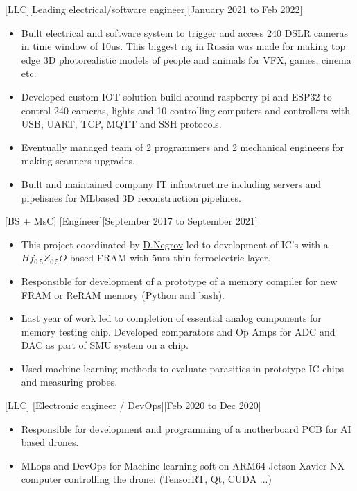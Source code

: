 \documentclass{article}
\begin{document}
[LLC][Leading electrical/software engineer][January 2021 to Feb 2022]
\begin{itemize}
   \item Built electrical and software system to trigger and access 240 DSLR cameras in time window of 10us. This biggest rig in Russia was made for making top edge 3D photorealistic models of people and animals for VFX, games, cinema etc.
   \item Developed custom IOT solution build around raspberry pi and ESP32 to control 240 cameras, lights and 10 controlling computers and controllers with USB, UART, TCP, MQTT and SSH protocols.
   \item Eventually managed team of 2 programmers and 2 mechanical engineers for making scanners upgrades.
   \item Built and maintained company IT infrastructure including servers and pipelisnes for MLbased 3D reconstruction pipelines.
   \end{itemize}

[BS + MsC]
[Engineer][September 2017 to September 2021]

\begin{itemize}
\item This project coordinated by  \href{https://www.scopus.com/authid/detail.uri?authorId=56272708000}{D.Negrov}   led to development of IC's with a $Hf_{0.5} Z_{0.5} O $ based  FRAM with 5nm thin ferroelectric layer.
\item Responsible for development of a prototype of a memory  compiler for new FRAM or ReRAM memory (Python and bash).
\item Last year of work led to completion of essential analog components for memory testing chip. Developed comparators and Op Amps for ADC and DAC as part of SMU system on a chip.
\item Used machine learning methods to evaluate parasitics in prototype IC chips and measuring probes.

\end{itemize}
 

 
[LLC]
[Electronic engineer / DevOps][Feb 2020 to Dec 2020]
 
\begin{itemize}
\item Responsible for development and programming of a motherboard PCB for AI based drones.
\item MLops and DevOps for Machine learning soft on ARM64 Jetson Xavier NX computer controlling the drone. (TensorRT, Qt, CUDA ...)
\end{itemize}
 
\end{document}
